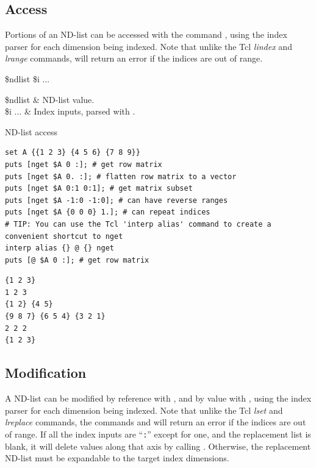 \subsection{Access}
Portions of an ND-list can be accessed with the command , using the index parser  for each dimension being indexed.
Note that unlike the Tcl \textit{lindex} and \textit{lrange} commands,  will return an error if the indices are out of range.
\begin{syntax}
 \$ndlist \$i ...
\end{syntax}
\begin{args}
\$ndlist & ND-list value. \\
\$i ... & Index inputs, parsed with . 
\end{args}
\begin{example}{ND-list access}
\begin{lstlisting}
set A {{1 2 3} {4 5 6} {7 8 9}}
puts [nget $A 0 :]; # get row matrix
puts [nget $A 0. :]; # flatten row matrix to a vector
puts [nget $A 0:1 0:1]; # get matrix subset
puts [nget $A -1:0 -1:0]; # can have reverse ranges
puts [nget $A {0 0 0} 1.]; # can repeat indices
# TIP: You can use the Tcl 'interp alias' command to create a convenient shortcut to nget
interp alias {} @ {} nget
puts [@ $A 0 :]; # get row matrix
\end{lstlisting}
\tcblower
\begin{lstlisting}
{1 2 3}
1 2 3
{1 2} {4 5}
{9 8 7} {6 5 4} {3 2 1}
2 2 2
{1 2 3}
\end{lstlisting}
\end{example}

\clearpage
\subsection{Modification}
A ND-list can be modified by reference with , and by value with , using the index parser  for each dimension being indexed.
Note that unlike the Tcl \textit{lset} and \textit{lreplace} commands, the commands  and  will return an error if the indices are out of range.
If all the index inputs are ``\texttt{:}'' except for one, and the replacement list is blank, it will delete values along that axis by calling .
Otherwise, the replacement ND-list must be expandable to the target index dimensions. 

